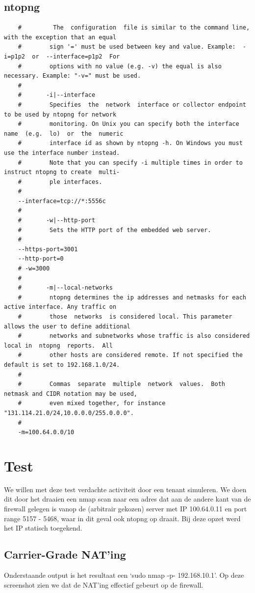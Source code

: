 \subsection{ntopng}
\begin{verbatim}
    #         The  configuration  file is similar to the command line, with the exception that an equal
    #        sign '=' must be used between key and value. Example:  -i=p1p2  or  --interface=p1p2  For
    #        options with no value (e.g. -v) the equal is also necessary. Example: "-v=" must be used.
    #
    #       -i|--interface
    #        Specifies  the  network  interface or collector endpoint to be used by ntopng for network
    #        monitoring. On Unix you can specify both the interface name  (e.g.  lo)  or  the  numeric
    #        interface id as shown by ntopng -h. On Windows you must use the interface number instead.
    #        Note that you can specify -i multiple times in order to instruct ntopng to create  multi-
    #        ple interfaces.
    #
    --interface=tcp://*:5556c
    #
    #       -w|--http-port
    #        Sets the HTTP port of the embedded web server.
    #
    --https-port=3001
    --http-port=0
    # -w=3000
    #
    #       -m|--local-networks
    #        ntopng determines the ip addresses and netmasks for each active interface. Any traffic on
    #        those  networks  is considered local. This parameter allows the user to define additional
    #        networks and subnetworks whose traffic is also considered local in  ntopng  reports.  All
    #        other hosts are considered remote. If not specified the default is set to 192.168.1.0/24.
    #
    #        Commas  separate  multiple  network  values.  Both netmask and CIDR notation may be used,
    #        even mixed together, for instance "131.114.21.0/24,10.0.0.0/255.0.0.0".
    #
    -m=100.64.0.0/10
\end{verbatim}
\section{Test}
We willen met deze test verdachte activiteit door een tenant simuleren. We doen dit door het draaien een nmap scan naar een adres dat aan de andere kant van de firewall gelegen is vanop de (arbitrair gekozen) server met IP 100.64.0.11 en port range 5157 - 5468, waar in dit geval ook ntopng op draait. Bij deze opzet werd het IP statisch toegekend.

\subsection{Carrier-Grade NAT’ing}
Onderstaande output is het resultaat een ‘sudo nmap -p- 192.168.10.1’. Op deze screenshot zien we dat de NAT’ing effectief gebeurt op de firewall.

